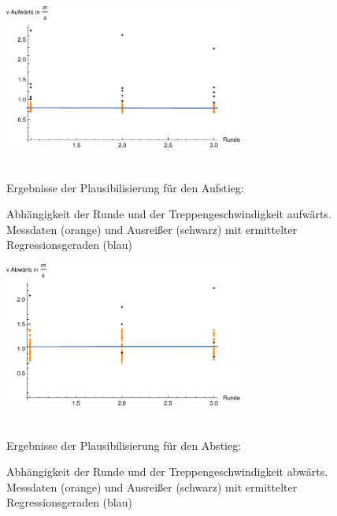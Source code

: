 \begin{figure}[htpb]
\centering
\includegraphics[width=0.7\textwidth]{abbildungen/regression/2012_2017_verbund/ohneausreisser/auf-runde.pdf}
\caption{Abhängigkeit der Runde und der Treppengeschwindigkeit aufwärts. Messdaten (orange) und Ausreißer (schwarz) mit ermittelter Regressionsgeraden (blau)}
\label{fig:2012_und_2017_MA_auf_runde}
\justify \ \\
Ergebnisse der Plausibilisierung für den Aufstieg:

\end{figure}
\begin{figure}[htpb]
\centering
\includegraphics[width=0.7\textwidth]{abbildungen/regression/2012_2017_verbund/ohneausreisser/ab-runde.pdf}
\caption{Abhängigkeit der Runde und der Treppengeschwindigkeit abwärts. Messdaten (orange) und Ausreißer (schwarz) mit ermittelter Regressionsgeraden (blau)}
\label{fig:2012_und_2017_MA_ab_runde}
\justify \ \\
Ergebnisse der Plausibilisierung für den Abstieg:

\end{figure}



